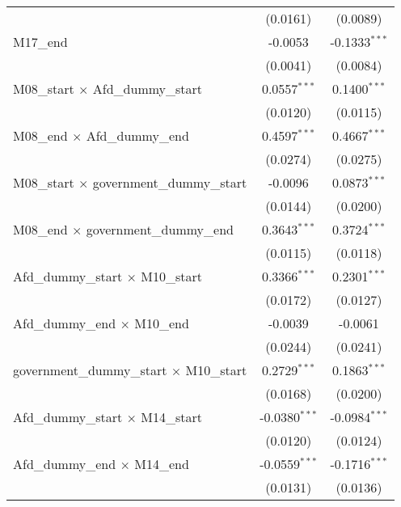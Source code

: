 \documentclass[10pt,a4paper]{article}
\begin{document}
\begin{tabular}{lcc}
                                                    & (0.0161)        & (0.0089)\\   
   M17\_end                                         & -0.0053         & -0.1333$^{***}$\\   
                                                    & (0.0041)        & (0.0084)\\   
   M08\_start $\times$ Afd\_dummy\_start            & 0.0557$^{***}$  & 0.1400$^{***}$\\   
                                                    & (0.0120)        & (0.0115)\\   
   M08\_end $\times$ Afd\_dummy\_end                & 0.4597$^{***}$  & 0.4667$^{***}$\\   
                                                    & (0.0274)        & (0.0275)\\   
   M08\_start $\times$ government\_dummy\_start     & -0.0096         & 0.0873$^{***}$\\   
                                                    & (0.0144)        & (0.0200)\\   
   M08\_end $\times$ government\_dummy\_end         & 0.3643$^{***}$  & 0.3724$^{***}$\\   
                                                    & (0.0115)        & (0.0118)\\   
   Afd\_dummy\_start $\times$ M10\_start            & 0.3366$^{***}$  & 0.2301$^{***}$\\   
                                                    & (0.0172)        & (0.0127)\\   
   Afd\_dummy\_end $\times$ M10\_end                & -0.0039         & -0.0061\\   
                                                    & (0.0244)        & (0.0241)\\   
   government\_dummy\_start $\times$ M10\_start     & 0.2729$^{***}$  & 0.1863$^{***}$\\   
                                                    & (0.0168)        & (0.0200)\\   
   Afd\_dummy\_start $\times$ M14\_start            & -0.0380$^{***}$ & -0.0984$^{***}$\\   
                                                    & (0.0120)        & (0.0124)\\   
   Afd\_dummy\_end $\times$ M14\_end                & -0.0559$^{***}$ & -0.1716$^{***}$\\   
                                                    & (0.0131)        & (0.0136)\\   

\end{tabular}
\end{document}
